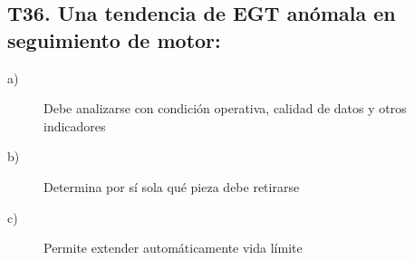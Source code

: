 \subsection*{T36. Una tendencia de EGT anómala en seguimiento de motor:}
\begin{description}
\item[a)] Debe analizarse con condición operativa, calidad de datos y otros indicadores
\item[b)] Determina por sí sola qué pieza debe retirarse
\item[c)] Permite extender automáticamente vida límite
\end{description}

